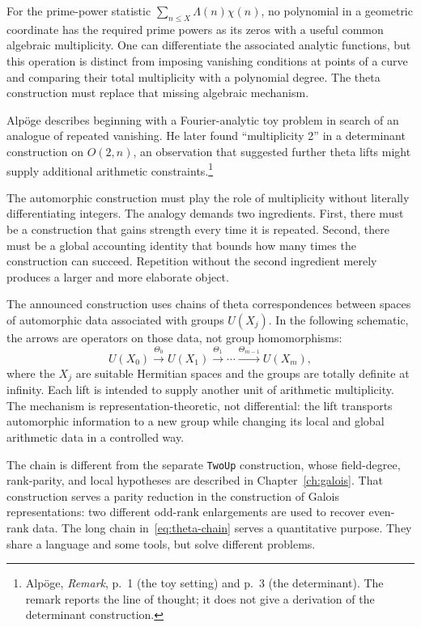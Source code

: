 \documentclass[11pt,openany,oneside]{scrbook}
\theoremstyle{definition}
\theoremstyle{remark}
\begin{document}
For the prime-power statistic $\sum_{n\le X}\Lambda(n)\chi(n)$, no polynomial in a geometric coordinate has the required prime powers as its zeros with a useful common algebraic multiplicity. One can differentiate the associated analytic functions, but this operation is distinct from imposing vanishing conditions at points of a curve and comparing their total multiplicity with a polynomial degree. The theta construction must replace that missing algebraic mechanism.

Alp\"oge describes beginning with a Fourier-analytic toy problem in search of an analogue of repeated vanishing. He later found ``multiplicity 2'' in a determinant construction on $O(2,n)$, an observation that suggested further theta lifts might supply additional arithmetic constraints.\footnote{Alp\"oge, \emph{Remark}, p.~1 (the toy setting) and p.~3 (the determinant). The remark reports the line of thought; it does not give a derivation of the determinant construction.}

The automorphic construction must play the role of multiplicity without literally differentiating integers. The analogy demands two ingredients. First, there must be a construction that gains strength every time it is repeated. Second, there must be a global accounting identity that bounds how many times the construction can succeed. Repetition without the second ingredient merely produces a larger and more elaborate object.

The announced construction uses chains of theta correspondences between spaces of automorphic data associated with groups $U(X_j)$.  In the following schematic, the arrows are operators on those data, not group homomorphisms:
\begin{equation}\label{eq:theta-chain}
U(X_0)\xrightarrow{\Theta_0}U(X_1)
\xrightarrow{\Theta_1}\cdots
\xrightarrow{\Theta_{m-1}}U(X_m),
\end{equation}
where the $X_j$ are suitable Hermitian spaces and the groups are totally definite at infinity. Each lift is intended to supply another unit of arithmetic multiplicity. The mechanism is representation-theoretic, not differential: the lift transports automorphic information to a new group while changing its local and global arithmetic data in a controlled way.

The chain is different from the separate \texttt{TwoUp} construction, whose field-degree, rank-parity, and local hypotheses are described in Chapter~\ref{ch:galois}. That construction serves a parity reduction in the construction of Galois representations: two different odd-rank enlargements are used to recover even-rank data. The long chain in~\eqref{eq:theta-chain} serves a quantitative purpose. They share a language and some tools, but solve different problems.
\end{document}
